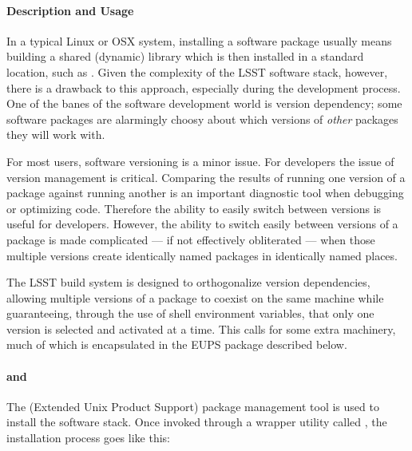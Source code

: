 \paragraph{Description and Usage}

In a typical Linux or OSX system, installing a software package usually means
building a shared (dynamic) library which is then installed in a standard
location, such as . Given the complexity of the LSST
software stack, however, there is a drawback to this approach, especially during
the development process. One of the banes of the software development world is
version dependency; some software packages are alarmingly choosy about which
versions of \textit{other} packages they will work with. 

For most users, software versioning is a minor issue. For developers the issue
of version management is critical. Comparing the results of running one version
of a package against running another is an important diagnostic tool when
debugging or optimizing code. Therefore the ability to easily switch between
versions is useful for developers. However, the ability to switch easily between
versions of a package is made complicated --- if not effectively obliterated ---
when those multiple versions create identically named packages in identically
named places.

The LSST build system is designed to orthogonalize version dependencies,
allowing multiple versions of a package to coexist on the same machine while
guaranteeing, through the use of shell environment variables, that only one
version is selected and activated at a time. This calls for some extra
machinery, much of which is encapsulated in the EUPS package described below.

\paragraph{ and }

The  (Extended Unix Product Support) package management tool is used
to install the software stack. Once invoked through a wrapper utility called
, the installation process goes like this:

